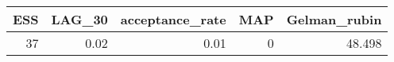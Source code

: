 \begin{longtable}{rrrrr}
\toprule
ESS & LAG\_30 & acceptance\_rate & MAP & Gelman\_rubin \\ 
\midrule
37 & 0.02 & 0.01 & 0 & 48.498 \\ 
\bottomrule
\end{longtable}

